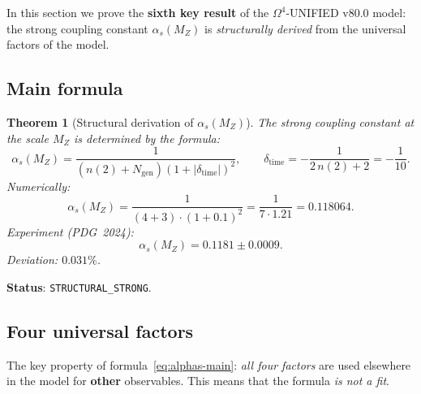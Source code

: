 \documentclass[11pt,a4paper]{article}
\newcommand{\Om}{\ensuremath{\Omega^4}}
\newcommand{\Ngen}{\ensuremath{N_{\text{gen}}}}
\newtheorem{theorem}{Theorem}[section]
\theoremstyle{definition}
\begin{document}
In this section we prove the \textbf{sixth key result}
of the $\Om$-UNIFIED v80.0 model: the strong coupling constant
$\alpha_s(M_Z)$ is \emph{structurally derived} from the universal
factors of the model.

\subsection{Main formula}
\label{subsec:alphas-formula}

\begin{theorem}[Structural derivation of $\alpha_s(M_Z)$]
\label{thm:alphas-structural}
The strong coupling constant at the scale $M_Z$ is determined by the formula:
\begin{equation}
    \boxed{
    \alpha_s(M_Z) = \frac{1}{(n(2) + \Ngen)(1 + |\delta_{\text{time}}|)^2},
    \qquad
    \delta_{\text{time}} = -\frac{1}{2\,n(2) + 2} = -\frac{1}{10}.
    }
    \label{eq:alphas-main}
\end{equation}
Numerically:
\begin{equation}
    \alpha_s(M_Z) = \frac{1}{(4 + 3) \cdot (1 + 0.1)^2}
    = \frac{1}{7 \cdot 1.21} = 0.118064.
\end{equation}
Experiment (PDG~2024):
\begin{equation}
    \alpha_s(M_Z) = 0.1181 \pm 0.0009.
\end{equation}
Deviation: $\mathbf{0.031\%}$.
\end{theorem}

\medskip\noindent
\textbf{Status}: \texttt{STRUCTURAL\_STRONG}.

\subsection{Four universal factors}
\label{subsec:alphas-audit}

The key property of formula~\eqref{eq:alphas-main}:
\emph{all four factors} are used elsewhere in the model
for \textbf{other} observables. This means that the formula
\emph{is not a fit}.
\end{document}
